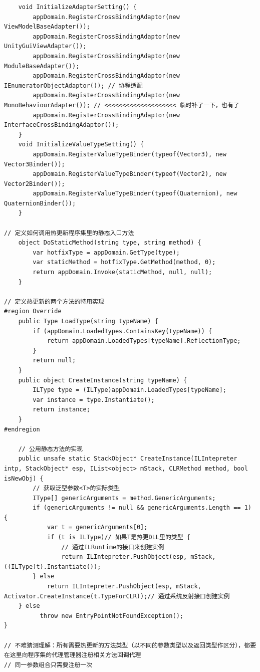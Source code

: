 \documentclass[9pt, b5paper]{article}
\begin{document}
\begin{verbatim}
    void InitializeAdapterSetting() {
        appDomain.RegisterCrossBindingAdaptor(new ViewModelBaseAdapter());  
        appDomain.RegisterCrossBindingAdaptor(new UnityGuiViewAdapter());   
        appDomain.RegisterCrossBindingAdaptor(new ModuleBaseAdapter());     
        appDomain.RegisterCrossBindingAdaptor(new IEnumeratorObjectAdaptor()); // 协程适配
        appDomain.RegisterCrossBindingAdaptor(new MonoBehaviourAdapter()); // <<<<<<<<<<<<<<<<<<<< 临时补了一下，也有了
        appDomain.RegisterCrossBindingAdaptor(new InterfaceCrossBindingAdaptor());
    }
    void InitializeValueTypeSetting() {
        appDomain.RegisterValueTypeBinder(typeof(Vector3), new Vector3Binder());
        appDomain.RegisterValueTypeBinder(typeof(Vector2), new Vector2Binder());
        appDomain.RegisterValueTypeBinder(typeof(Quaternion), new QuaternionBinder());
    }

// 定义如何调用热更新程序集里的静态入口方法
    object DoStaticMethod(string type, string method) {　
        var hotfixType = appDomain.GetType(type);
        var staticMethod = hotfixType.GetMethod(method, 0);
        return appDomain.Invoke(staticMethod, null, null);
    }

// 定义热更新的两个方法的特用实现    
#region Override
    public Type LoadType(string typeName) {
        if (appDomain.LoadedTypes.ContainsKey(typeName)) {
            return appDomain.LoadedTypes[typeName].ReflectionType;
        }
        return null;
    }
    public object CreateInstance(string typeName) {
        ILType type = (ILType)appDomain.LoadedTypes[typeName];
        var instance = type.Instantiate();
        return instance;
    }
#endregion

    // 公用静态方法的实现
    public unsafe static StackObject* CreateInstance(ILIntepreter intp, StackObject* esp, IList<object> mStack, CLRMethod method, bool isNewObj) {
        // 获取泛型参数<T>的实际类型
        IType[] genericArguments = method.GenericArguments;
        if (genericArguments != null && genericArguments.Length == 1) {
            var t = genericArguments[0];
            if (t is ILType)// 如果T是热更DLL里的类型 {
                // 通过ILRuntime的接口来创建实例
                return ILIntepreter.PushObject(esp, mStack, ((ILType)t).Instantiate());
        } else
            return ILIntepreter.PushObject(esp, mStack, Activator.CreateInstance(t.TypeForCLR));// 通过系统反射接口创建实例
    } else
          throw new EntryPointNotFoundException();
}

// 不难猜测理解：所有需要热更新的方法类型（以不同的参数类型以及返回类型作区分），都要在这里向程序集的代理管理器注册相关方法回调代理    
// 同一参数组合只需要注册一次


\end{verbatim}
\end{document}
